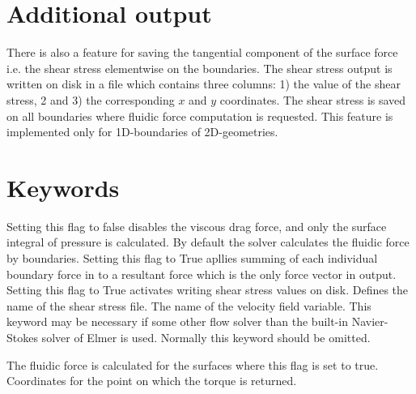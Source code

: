 \begin{versiona}
\section{Additional output}

There is also a feature for saving the tangential component of the
surface force i.e. the shear stress elementwise on the boundaries. The
shear stress output is written on disk in a file which contains three
columns: 1) the value of the shear stress, 2 and 3) the corresponding
$x$ and $y$ coordinates.
The shear stress is saved on all boundaries where fluidic force
computation is requested. This feature is implemented only for
1D-boundaries of 2D-geometries.


\section{Keywords}
\end{versiona}

\sifbegin
{}
\sifbegin
{}
Setting this flag to false disables the viscous drag force, and only
the surface integral of pressure is calculated.
By default the solver calculates the fluidic force by
boundaries. Setting this flag to True apllies summing of each
individual boundary force in to a resultant force which is the only
force vector in output.
Setting this flag to True activates writing shear stress values on
disk.
Defines the name of the shear stress file.
The name of the velocity field variable. This keyword may be necessary
if some other flow solver than the built-in Navier-Stokes solver of
Elmer is used. Normally this keyword should be omitted.
\sifend

\sifbegin
{}
\sifend

\sifbegin
{}
The fluidic force is calculated for the surfaces where 
this flag is set to true.
Coordinates for the point on which the torque is returned.
\sifend
\sifend


